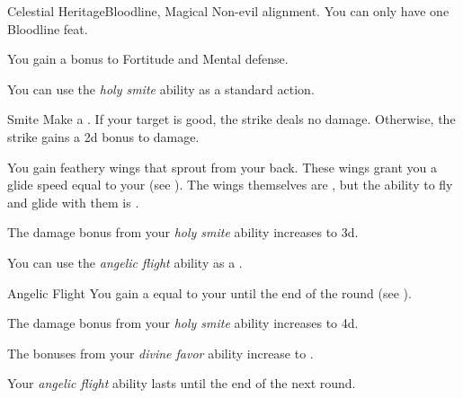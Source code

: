     \begin{feat}{Celestial Heritage}{Bloodline, Magical}
        \featpre Non-evil alignment.
         You can only have one Bloodline feat.

         You gain a  bonus to Fortitude and Mental defense.

         You can use the \textit{holy smite} ability as a standard action.
        \begin{apability}{Smite}
            Make a .
            If your target is good, the strike deals no damage.
            Otherwise, the strike gains a \plus2d bonus to damage.
        \end{apability}

         You gain feathery wings that sprout from your back.
        These wings grant you a glide speed equal to your  (see ).
        The wings themselves are , but the ability to fly and glide with them is .


         The damage bonus from your \textit{holy smite} ability increases to \plus3d.

         You can use the \textit{angelic flight} ability as a .
        \begin{apability}{Angelic Flight}
            You gain a  equal to your  until the end of the round (see ).
        \end{apability}

         The damage bonus from your \textit{holy smite} ability increases to \plus4d.

         The bonuses from your \textit{divine favor} ability increase to .

         Your \textit{angelic flight} ability lasts until the end of the next round.
    \end{feat}

